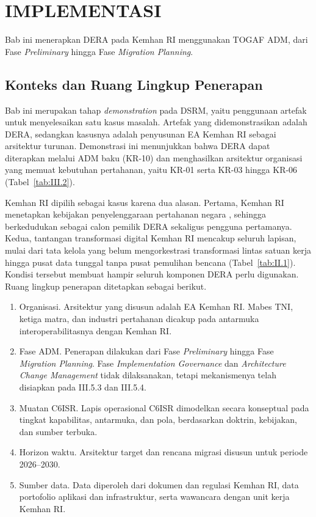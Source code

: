 \cleardoublepage
\chapter{IMPLEMENTASI}
\label{chap:IV}

Bab ini menerapkan DERA pada Kemhan RI menggunakan TOGAF ADM, dari Fase \textit{Preliminary} hingga Fase \textit{Migration Planning}.

\section{Konteks dan Ruang Lingkup Penerapan}
\label{sec:IV.1}

Bab ini merupakan tahap \textit{demonstration} pada DSRM, yaitu penggunaan artefak untuk menyelesaikan satu kasus masalah. Artefak yang didemonstrasikan adalah DERA, sedangkan kasusnya adalah penyusunan EA Kemhan RI sebagai arsitektur turunan. Demonstrasi ini menunjukkan bahwa DERA dapat diterapkan melalui ADM baku (KR-10) dan menghasilkan arsitektur organisasi yang memuat kebutuhan pertahanan, yaitu KR-01 serta KR-03 hingga KR-06 (Tabel~\ref{tab:III.2}).

Kemhan RI dipilih sebagai kasus karena dua alasan. Pertama, Kemhan RI menetapkan kebijakan penyelenggaraan pertahanan negara \cite{UU3Tahun2002}, sehingga berkedudukan sebagai calon pemilik DERA sekaligus pengguna pertamanya. Kedua, tantangan transformasi digital Kemhan RI mencakup seluruh lapisan, mulai dari tata kelola yang belum mengorkestrasi transformasi lintas satuan kerja hingga pusat data tunggal tanpa pusat pemulihan bencana (Tabel~\ref{tab:II.1}). Kondisi tersebut membuat hampir seluruh komponen DERA perlu digunakan. Ruang lingkup penerapan ditetapkan sebagai berikut.

\begin{enumerate}[label=\arabic*.]
\item Organisasi. Arsitektur yang disusun adalah EA Kemhan RI. Mabes TNI, ketiga matra, dan industri pertahanan dicakup pada antarmuka interoperabilitasnya dengan Kemhan RI.
\item Fase ADM. Penerapan dilakukan dari Fase \textit{Preliminary} hingga Fase \textit{Migration Planning}. Fase \textit{Implementation Governance} dan \textit{Architecture Change Management} tidak dilaksanakan, tetapi mekanismenya telah disiapkan pada III.5.3 dan III.5.4.
\item Muatan C6ISR. Lapis operasional C6ISR dimodelkan secara konseptual pada tingkat kapabilitas, antarmuka, dan pola, berdasarkan doktrin, kebijakan, dan sumber terbuka.
\item Horizon waktu. Arsitektur target dan rencana migrasi disusun untuk periode 2026–2030.
\item Sumber data. Data diperoleh dari dokumen dan regulasi Kemhan RI, data portofolio aplikasi dan infrastruktur, serta wawancara dengan unit kerja Kemhan RI.
\end{enumerate}


